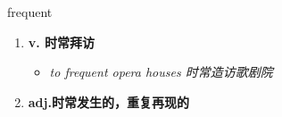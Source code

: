 
\begin{frame}
{\huge frequent}
\begin{center}
\begin{enumerate}\Large
  \item \textbf{v. 时常拜访}
  \begin{itemize}
    \item \em{\Large{to frequent opera houses 时常造访歌剧院}}
  \end{itemize}
  \item \textbf{adj.时常发生的，重复再现的}
\end{enumerate}
\end{center}
\end{frame}
